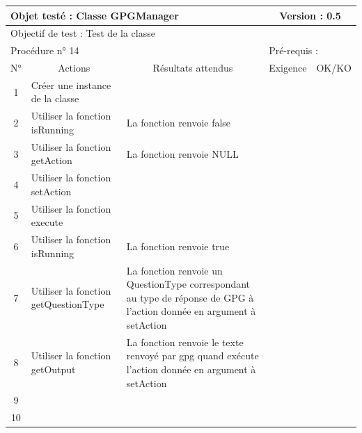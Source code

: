 \documentclass{../res/univ-projet}
\begin{document}
\begin{center}
    \begin{tabular}{|c|p{5cm}|p{5cm}|p{1.5cm}|p{1.5cm}|}
      \hline
      \multicolumn{3}{|l|}{Objet testé : Classe GPGManager} & \multicolumn{2}{c|}{Version : 0.5}\\ \hline
      \multicolumn{5}{|l|}{Objectif de test : Test de la classe}\\ \hline
      \multicolumn{3}{|l|}{Procédure n° 14} & \multicolumn{2}{p{3cm}|}{Pré-requis : }\\ \hline
      \multicolumn{1}{|c|}{N°} & \multicolumn{1}{c|}{Actions} & \multicolumn{1}{c|}{Résultats attendus} & 
      \multicolumn{1}{c|}{Exigence} & \multicolumn{1}{c|}{OK/KO}\\ \hline
      1 & Créer une instance de la classe &  &  & \\
      2 & Utiliser la fonction isRunning & La fonction renvoie false &  & \\
      3 & Utiliser la fonction getAction & La fonction renvoie NULL &  & \\
      4 & Utiliser la fonction setAction &  &  & \\
      5 & Utiliser la fonction execute &  &  & \\
	  6 & Utiliser la fonction isRunning & La fonction renvoie true &  & \\
      7 & Utiliser la fonction getQuestionType & La fonction renvoie un QuestionType correspondant au type de réponse de GPG à l'action donnée en argument à setAction &  & \\
      8 & Utiliser la fonction getOutput & La fonction renvoie le texte renvoyé par gpg quand exécute l'action donnée en argument à setAction &  & \\
      9 &  &  &  & \\
      10 &  &  &  &\\ 
	\hline
    \end{tabular}
    \vskip 2.2cm
	

\end{center}
\end{document}
